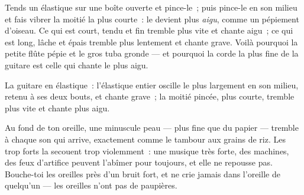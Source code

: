\begin{example}\label{ex:g3:sound-around-us:pitch}
Tends un élastique sur une boîte ouverte et pince-le~; puis pince-le
en son milieu et fais vibrer la moitié la plus courte~: le 
devient plus \emph{aigu}, comme un pépiement d'oiseau. Ce qui est
court, tendu et fin tremble plus vite et chante aigu~; ce qui est
long, lâche et épais tremble plus lentement et chante grave. Voilà
pourquoi la petite flûte pépie et le gros tuba gronde --- et pourquoi
la corde la plus fine de la guitare est celle qui chante le plus
aigu.
\end{example}

\begin{omfigure}

{\small La guitare en élastique~: l'élastique entier oscille le plus
largement en son milieu, retenu à ses deux bouts, et chante grave~;
la moitié pincée, plus courte, tremble plus vite et chante plus
aigu.}
\end{omfigure}

\begin{remark}\label{rem:g3:sound-around-us:ears}
Au fond de ton oreille, une minuscule peau --- plus fine que du
papier --- tremble à chaque son qui arrive, exactement comme le
tambour aux grains de riz. Les  trop forts la secouent trop
violemment~: une musique très forte, des machines, des feux
d'artifice peuvent l'abîmer pour toujours, et elle ne repousse pas.
Bouche-toi les oreilles près d'un bruit fort, et ne crie jamais dans
l'oreille de quelqu'un --- les oreilles n'ont pas de paupières.
\end{remark}

